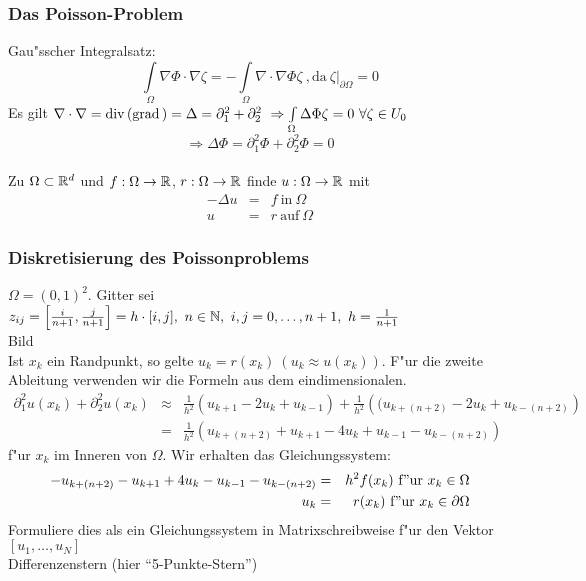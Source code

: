 \documentclass{scrartcl}
\begin{document}
\subsubsection{Das Poisson-Problem}
Gau"sscher Integralsatz:
$$ \int\limits_{\Omega} \nabla \Phi \cdot \nabla \zeta = - \int\limits_{\Omega} \nabla \cdot \nabla \Phi \zeta \mathrm{ \ ,da \ } \zeta \vert _{\partial \Omega} = 0$$
Es gilt $\nabla \cdot \nabla = \mathrm{div} \, (\mathrm{grad} \,) = \Delta = \partial_1^2 + \partial_2^2 \ \Rightarrow \int\limits_{\Omega} \Delta \Phi \zeta = 0 \ \forall \zeta \in U_0$
$$ \Rightarrow \Delta \Phi = \partial_1^2 \Phi + \partial_2^2 \Phi = 0$$
 \\
Zu $\Omega \subset \mathbb{R}^d$ und $f: \Omega \rightarrow \mathbb{R}$, $r: \Omega \rightarrow \mathbb{R}$ finde $u: \Omega \rightarrow \mathbb{R}$ mit
\begin{eqnarray*}
- \Delta u & = & f \mathrm{\ in \ } \Omega \\
u & = & r\mathrm{ \ auf \ } \Omega
\end{eqnarray*}

\subsubsection{Diskretisierung des Poissonproblems}
$\Omega = (0,1)^2$. Gitter sei $z_{ij} = \left[ \frac{i}{n+1}, \frac{j}{n+1} \right] = h \cdot [i,j], \ n \in \mathbb{N}, \ i,j = 0,\ldots, n+1, \ h = \frac{1}{n+1}$ \\
Bild \\
Ist $x_k$ ein Randpunkt, so gelte $u_k = r(x_k) \ (u_k \approx u(x_k))$. F"ur die zweite Ableitung verwenden wir die Formeln aus dem eindimensionalen.
\begin{eqnarray*}
\partial_1^2 u(x_k) + \partial_2^2 u(x_k) & \approx & \frac{1}{h^2} (u_{k+1} - 2 u_k + u_{k-1} ) + \frac{1}{h^2} \left( (u_{k+(n+2)} - 2u_k + u_{k-(n+2)} \right) \\
& = & \frac{1}{h^2} \left( u_{k+(n+2)} + u_{k+1} - 4 u_k + u_{k-1} - u_{k-(n+2)} \right)
\end{eqnarray*}
f"ur $x_k$ im Inneren von $\Omega$. Wir erhalten das Gleichungssystem:
\begin{eqnarray*}
-u_{k+(n+2)} - u_{k+1} + 4 u_k - u_{k-1} - u_{k-(n+2)} & = & h^2 f(x_k) \mathrm{ \ f"ur \ } x_k \in \Omega \\
u_k &= & r(x_k) \mathrm{\ f"ur \ } x_k \in \partial \Omega
\end{eqnarray*}
Formuliere dies als ein Gleichungssystem in Matrixschreibweise f"ur den Vektor $[ u_1, \ldots, u_N]$
\\
Differenzenstern (hier "`5-Punkte-Stern"') \\
\end{document}
